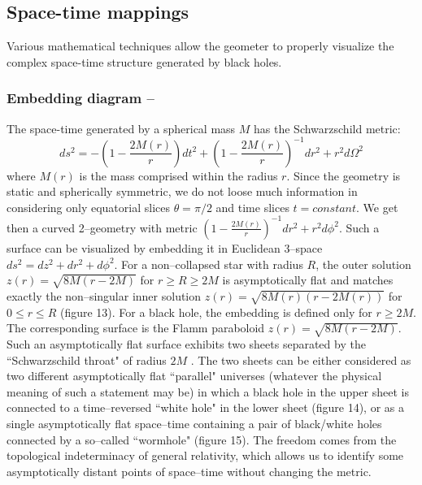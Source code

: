 \documentclass{lamuphys}
\begin{document}
\subsection{Space-time mappings}

Various mathematical techniques allow the geometer to properly visualize 
the complex space-time structure generated by black holes. 

\subsubsection{Embedding diagram --}

The space-time generated by a spherical mass $M$ has the 
Schwarzschild metric:
\begin{equation}
ds^2 = - \left(1- \frac{2M(r)}{r}\right)dt^2
+ \left(1-\frac{2M(r)}{r}\right)^{-1}dr^2 + r^2 d\Omega^2        
\end{equation}
where $M(r)$ is the mass comprised within the radius $r$. Since the 
geometry is static and spherically symmetric, we do not loose much 
information in considering only equatorial slices $\theta = \pi/2$ 
and time slices $t = constant$. We get then a curved 2--geometry with 
metric $(1-\frac{2M(r)}{r})^{-1}dr^2 + r^2 d\phi^2$. Such a surface 
can be visualized by embedding it in Euclidean 3--space
$ds^{2} = dz^{2} + dr^{2} + 
d\phi^{2}$. For a non--collapsed star with radius $R$, the outer solution
$z(r) = \sqrt{8M(r-2M)}$ for $r\geq R 
\ge 2M$ is asymptotically flat and matches exactly the non--singular inner solution 
$z(r) = \sqrt{8M(r)(r-2M(r))}$ for $0 \le r\le R$ (figure 13). For a 
black hole, the embedding is defined only for $r \geq 2M$. The 
corresponding surface is the Flamm paraboloid  $z(r) = 
\sqrt{8M(r-2M)}$. Such an asymptotically flat surface exhibits two 
sheets separated by the ``Schwarzschild throat" of radius $2M$ . The two sheets can be either considered as two 
different asymptotically flat ``parallel" universes (whatever the physical meaning of such 
a statement may be) in which a black hole in the upper sheet is 
connected 
to a time--reversed ``white hole" in the lower sheet (figure 14), or 
as a single asymptotically flat space--time containing a pair of 
black/white holes connected by a so--called ``wormhole" (figure 15). The freedom 
comes from the topological indeterminacy of general relativity, 
which allows us to identify some asymptotically distant points of 
space--time without changing the metric. 
\end{document}
